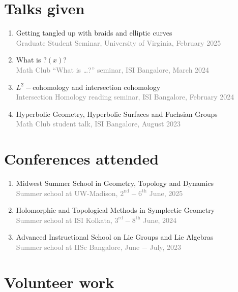 \documentclass[a4paper, oneside, final]{scrartcl} %
\begin{document}
\section{Talks given}

\begin{enumerate}[label = $\bullet$]
  \item Getting tangled up with braids and elliptic curves \\
    \textcolor{grey}{Graduate Student Seminar, University of Virginia, February 2025}
  \item What is \( ?(x) \)? \\
    \textcolor{grey}{Math Club ``What is \dots ?'' seminar, ISI Bangalore, March 2024}
  \item \( L^2- \)cohomology and intersection cohomology \\
    \textcolor{grey}{Intersection Homology reading seminar, ISI Bangalore, February 2024}
  \item Hyperbolic Geometry, Hyperbolic Surfaces and Fuchsian Groups \\
    \textcolor{grey}{Math Club student talk, ISI Bangalore, August 2023}
\end{enumerate}

\section{Conferences attended}

\begin{enumerate}[label = $\bullet$]
  \item Midwest Summer School in Geometry, Topology and Dynamics  \\
    \textcolor{grey}{Summer school at UW-Madison, \( {2}^{\text{nd}} -  {6}^{\text{th}} \) June, 2025}
  \item Holomorphic and Topological Methods in Symplectic Geometry \\
    \textcolor{grey}{Summer school at ISI Kolkata, \( {3}^{\text{rd}} -  {8}^{\text{th}} \) June, 2024}
  \item Advanced Instructional School on Lie Groups and Lie Algebras \\
    \textcolor{grey}{Summer school at IISc Bangalore, June \( - \) July, 2023}
\end{enumerate}

\section{Volunteer work}
\end{document}
